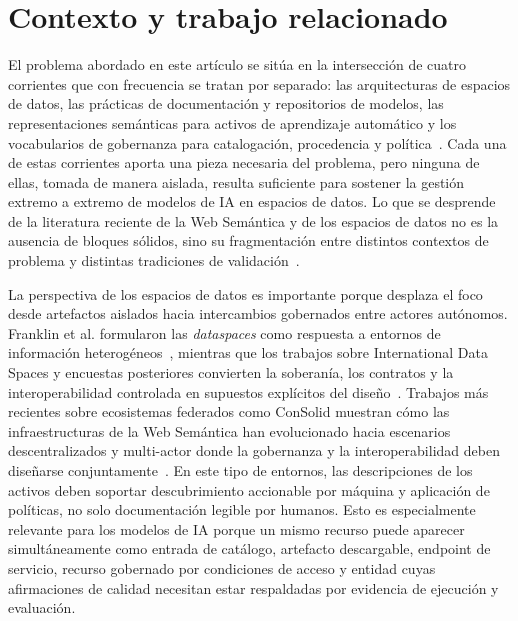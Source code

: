 \documentclass[11pt,a4paper]{article}
\begin{document}
\section{Contexto y trabajo relacionado}\label{sec:related}

El problema abordado en este artículo se sitúa en la intersección de cuatro corrientes que con frecuencia se tratan por separado: las arquitecturas de espacios de datos, las prácticas de documentación y repositorios de modelos, las representaciones semánticas para activos de aprendizaje automático y los vocabularios de gobernanza para catalogación, procedencia y política~\cite{otto19,mitchell19,mls,dcat2,odrl22,provo}. Cada una de estas corrientes aporta una pieza necesaria del problema, pero ninguna de ellas, tomada de manera aislada, resulta suficiente para sostener la gestión extremo a extremo de modelos de IA en espacios de datos. Lo que se desprende de la literatura reciente de la Web Semántica y de los espacios de datos no es la ausencia de bloques sólidos, sino su fragmentación entre distintos contextos de problema y distintas tradiciones de validación~\cite{werbrouck24,kurteva,palma,woods}.

La perspectiva de los espacios de datos es importante porque desplaza el foco desde artefactos aislados hacia intercambios gobernados entre actores autónomos. Franklin et al. formularon las \emph{dataspaces} como respuesta a entornos de información heterogéneos~\cite{franklin05}, mientras que los trabajos sobre International Data Spaces y encuestas posteriores convierten la soberanía, los contratos y la interoperabilidad controlada en supuestos explícitos del diseño~\cite{otto19,cappiello22}. Trabajos más recientes sobre ecosistemas federados como ConSolid muestran cómo las infraestructuras de la Web Semántica han evolucionado hacia escenarios descentralizados y multi-actor donde la gobernanza y la interoperabilidad deben diseñarse conjuntamente~\cite{werbrouck24}. En este tipo de entornos, las descripciones de los activos deben soportar descubrimiento accionable por máquina y aplicación de políticas, no solo documentación legible por humanos. Esto es especialmente relevante para los modelos de IA porque un mismo recurso puede aparecer simultáneamente como entrada de catálogo, artefacto descargable, endpoint de servicio, recurso gobernado por condiciones de acceso y entidad cuyas afirmaciones de calidad necesitan estar respaldadas por evidencia de ejecución y evaluación.
\end{document}
